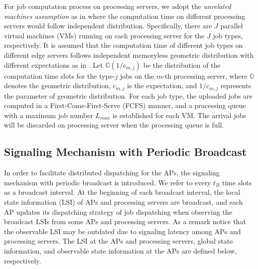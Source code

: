 For job computation process on processing servers, we adopt the \emph{unrelated machines assumption} as in \cite{tan-online} where the computation time on different processing servers would follow independent distribution.
Specifically, there are $J$ parallel virtual machines (VMs) running on each processing server for the $J$ job types, respectively.
It is assumed that the computation time of different job types on different edge servers follows independent memoryless geometric distribution 
with different expectations as in \cite{TOWC18-HuangKb}.
Let $\mathbb{G}(1/c_{m,j})$ be the distribution of the computation time slots for the type-$j$ jobs on the $m$-th processing server, where $\mathbb{G}$ denotes the geometric distribution, $c_{m,j}$ is the expectation, and {$1/c_{m,j}$ represents the parameter of geometric distribution}.
For each job type, the uploaded jobs are computed in a First-Come-First-Serve (FCFS) manner, and a processing queue with a maximum job number $L_{max}$ is established for each VM.
The arrival jobs will be discarded on processing server when the processing queue is full.
\subsection{{Signaling Mechanism with Periodic Broadcast}}
\label{subsec:broadcast}
In order to facilitate distributed dispatching for the APs, the signaling mechanism with periodic broadcast is introduced.
We refer to every $t_B$ time slots as a broadcast interval.
At the beginning of each broadcast interval, the local state information (LSI) of APs and processing servers are broadcast, and each AP updates its dispatching strategy of job dispatching when observing the broadcast LSIs from some APs and processing servers.
As a remark notice that the observable LSI may be outdated due to signaling latency among APs and processing servers.
The LSI at the APs and processing servers, global state information, and observable state information at the APs are defined below, respectively.

